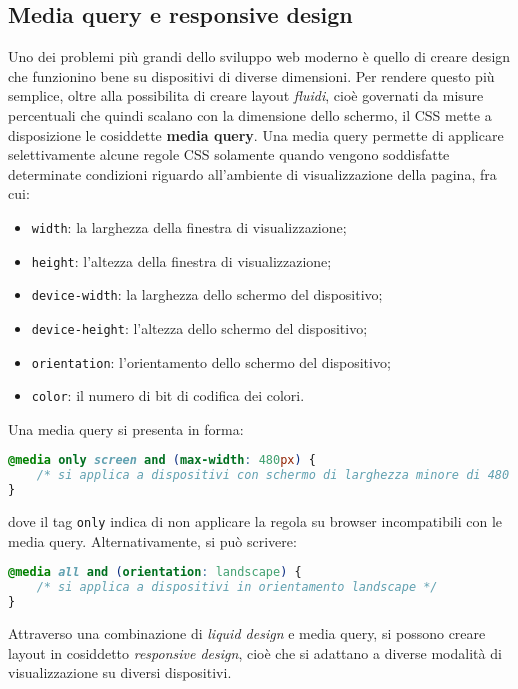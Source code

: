 \documentclass[a4paper,11pt]{article}
\begin{document}
\subsection{Media query e responsive design}
Uno dei problemi più grandi dello sviluppo web moderno è quello di creare design che funzionino bene su dispositivi di diverse dimensioni.
Per rendere questo più semplice, oltre alla possibilita di creare layout \textit{fluidi}, cioè governati da misure percentuali che quindi scalano con la dimensione dello schermo, il CSS mette a disposizione le cosiddette \textbf{media query}.
Una media query permette di applicare selettivamente alcune regole CSS solamente quando vengono soddisfatte determinate condizioni riguardo all'ambiente di visualizzazione della pagina, fra cui:
\begin{itemize}
	\item \lstinline|width|: la larghezza della finestra di visualizzazione;
	\item \lstinline|height|: l'altezza della finestra di visualizzazione;
	\item \lstinline|device-width|: la larghezza dello schermo del dispositivo;
	\item \lstinline|device-height|: l'altezza dello schermo del dispositivo;
	\item \lstinline|orientation|: l'orientamento dello schermo del dispositivo;
	\item \lstinline|color|: il numero di bit di codifica dei colori.
\end{itemize}

Una media query si presenta in forma:
\begin{lstlisting}[language=css, style=codestyle]	
@media only screen and (max-width: 480px) {
	/* si applica a dispositivi con schermo di larghezza minore di 480 px */
}
\end{lstlisting}
dove il tag \lstinline|only| indica di non applicare la regola su browser incompatibili con le media query.
Alternativamente, si può scrivere:
\begin{lstlisting}[language=css, style=codestyle]	
@media all and (orientation: landscape) {
	/* si applica a dispositivi in orientamento landscape */
}
\end{lstlisting}

Attraverso una combinazione di \textit{liquid design} e media query, si possono creare layout in cosiddetto \textit{responsive design}, cioè che si adattano a diverse modalità di visualizzazione su diversi dispositivi.
\end{document}
